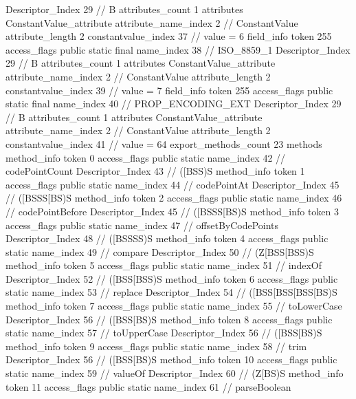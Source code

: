 {{{{{				Descriptor_Index	29		// B
				attributes_count	1
				attributes {
				ConstantValue_attribute {
					attribute_name_index	2		// ConstantValue
					attribute_length	2
					constantvalue_index	37		// value = 6
				}
				}
			}
			field_info {
				token	255
				access_flags	public static final
				name_index	38		// ISO_8859_1
				Descriptor_Index	29		// B
				attributes_count	1
				attributes {
				ConstantValue_attribute {
					attribute_name_index	2		// ConstantValue
					attribute_length	2
					constantvalue_index	39		// value = 7
				}
				}
			}
			field_info {
				token	255
				access_flags	public static final
				name_index	40		// PROP_ENCODING_EXT
				Descriptor_Index	29		// B
				attributes_count	1
				attributes {
				ConstantValue_attribute {
					attribute_name_index	2		// ConstantValue
					attribute_length	2
					constantvalue_index	41		// value = 64
				}
				}
			}
			}
			export_methods_count	23
			methods {
				method_info {
					token	0
					access_flags	public static
					name_index	42		// codePointCount
					Descriptor_Index	43		// ([BSS)S
				}
				method_info {
					token	1
					access_flags	public static
					name_index	44		// codePointAt
					Descriptor_Index	45		// ([BSSS[BS)S
				}
				method_info {
					token	2
					access_flags	public static
					name_index	46		// codePointBefore
					Descriptor_Index	45		// ([BSSS[BS)S
				}
				method_info {
					token	3
					access_flags	public static
					name_index	47		// offsetByCodePoints
					Descriptor_Index	48		// ([BSSSS)S
				}
				method_info {
					token	4
					access_flags	public static
					name_index	49		// compare
					Descriptor_Index	50		// (Z[BSS[BSS)S
				}
				method_info {
					token	5
					access_flags	public static
					name_index	51		// indexOf
					Descriptor_Index	52		// ([BSS[BSS)S
				}
				method_info {
					token	6
					access_flags	public static
					name_index	53		// replace
					Descriptor_Index	54		// ([BSS[BSS[BSS[BS)S
				}
				method_info {
					token	7
					access_flags	public static
					name_index	55		// toLowerCase
					Descriptor_Index	56		// ([BSS[BS)S
				}
				method_info {
					token	8
					access_flags	public static
					name_index	57		// toUpperCase
					Descriptor_Index	56		// ([BSS[BS)S
				}
				method_info {
					token	9
					access_flags	public static
					name_index	58		// trim
					Descriptor_Index	56		// ([BSS[BS)S
				}
				method_info {
					token	10
					access_flags	public static
					name_index	59		// valueOf
					Descriptor_Index	60		// (Z[BS)S
				}
				method_info {
					token	11
					access_flags	public static
					name_index	61		// parseBoolean
}}}}}
